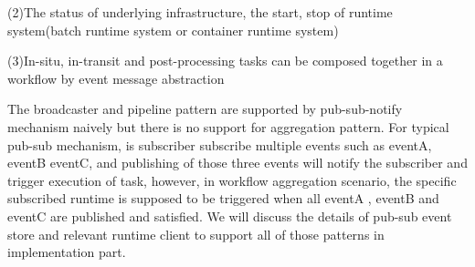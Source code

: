 (2)The status of underlying infrastructure, the start, stop of runtime system(batch runtime system or container runtime system)

(3)In-situ, in-transit and post-processing tasks can be composed together in a workflow by event message abstraction

The broadcaster and pipeline pattern are supported by pub-sub-notify mechanism naively but there is no support for aggregation pattern. For typical pub-sub mechanism, is subscriber subscribe multiple events such as eventA, eventB eventC, and publishing of those three events will notify the subscriber and trigger execution of task, however, in workflow aggregation scenario, the specific subscribed runtime is supposed to be triggered when all eventA , eventB and eventC are published and satisfied. We will discuss the details of pub-sub event store and relevant runtime client to support all of those patterns in implementation part. 
